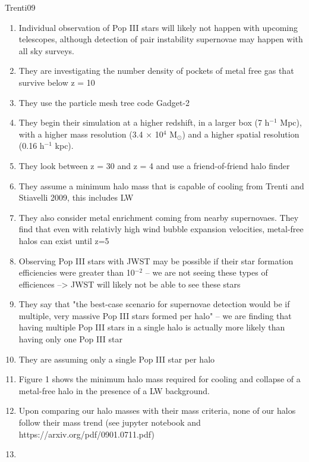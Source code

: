 \documentclass[a4paper,fleqn,usenatbib]{mnras}
\begin{document}
\li Trenti09
\begin{enumerate}
	\item Individual observation of Pop III stars will likely not happen with upcoming telescopes, although detection of pair instability supernovae may happen with all sky surveys.
	\item They are investigating the number density of pockets of metal free gas that survive below z = 10
	\item They use the particle mesh tree code Gadget-2 
	\item They begin their simulation at a higher redshift, in a larger box (7 h$^{-1}$ Mpc), with a higher mass resolution (3.4 $
	\times$ 10$^{4}$ M$_{\odot}$) and a higher spatial resolution (0.16 h$^{-1}$ kpc).
	\item They look between z = 30 and z = 4 and use a friend-of-friend halo finder
	\item They assume a minimum halo mass that is capable of cooling from Trenti and Stiavelli 2009, this includes LW 
	\item They also consider metal enrichment coming from nearby supernovaes. They find that even with relativly high wind bubble expansion velocities, metal-free halos can exist until z=5
	\item Observing Pop III stars with JWST may be possible if their star formation efficiencies were greater than 10$^{-2}$ -- we are not seeing these types of efficiences --> JWST will likely not be able to see these stars
	\item They say that "the best-case scenario for supernovae detection would be if multiple, very massive Pop III stars formed per halo" -- we are finding that having multiple Pop III stars in a single halo is actually more likely than having only one Pop III star
	\item They are assuming only a single Pop III star per halo
	\item Figure 1 shows the minimum halo mass required for cooling and collapse of a metal-free halo in the presence of a LW background. 
	\item Upon comparing our halo masses with their mass criteria, none of our halos follow their mass trend (see jupyter notebook and https://arxiv.org/pdf/0901.0711.pdf)
	\item 
\end{enumerate}
\end{document}
